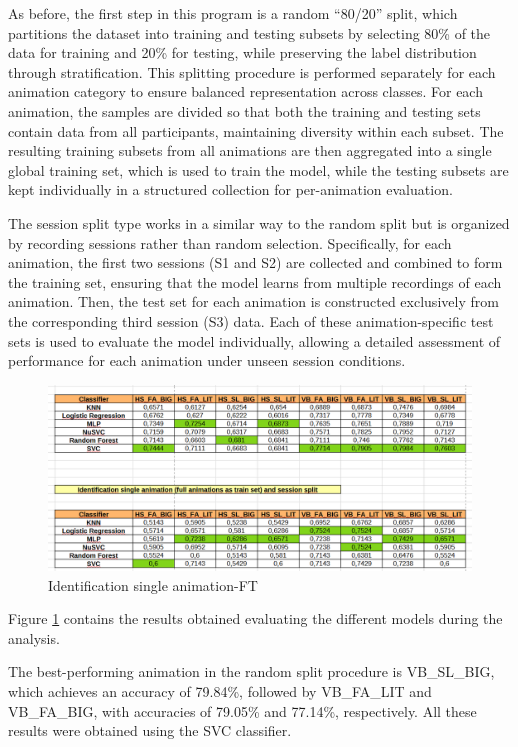 \documentclass{article}
\begin{document}
As before, the first step in this program is a random “80/20” split, which partitions the dataset into training and testing subsets by selecting 80\% of the data for training and 20\% for testing, while preserving the label distribution through stratification. 
This splitting procedure is performed separately for each animation category to ensure balanced representation across classes. 
For each animation, the samples are divided so that both the training and testing sets contain data from all participants, maintaining diversity within each subset. 
The resulting training subsets from all animations are then aggregated into a single global training set, which is used to train the model, while the testing subsets are kept individually in a structured collection for per-animation evaluation. 

The session split type works in a similar way to the random split but is organized by recording sessions rather than random selection. 
Specifically, for each animation, the first two sessions (S1 and S2) are collected and combined to form the training set, ensuring that the model learns from multiple recordings of each animation. 
Then, the test set for each animation is constructed exclusively from the corresponding third session (S3) data. 
Each of these animation-specific test sets is used to evaluate the model individually, allowing a detailed assessment of performance for each animation under unseen session conditions.

\begin{figure}[ht]
    \centering
    \includegraphics[width = 0.8
    \textwidth]{Images/Results/Identification_single/single_id_ft.png}
    \caption{Identification single animation-FT}
    \label{fig:id_s_ft}
\end{figure}

Figure \ref{fig:id_s_ft} contains the results obtained evaluating the different models during the analysis.

The best-performing animation in the random split procedure is VB\_SL\_BIG, which achieves an accuracy of 79.84\%, followed by VB\_FA\_LIT and VB\_FA\_BIG, with accuracies of 79.05\% and 77.14\%, respectively.
All these results were obtained using the SVC classifier.
\end{document}
